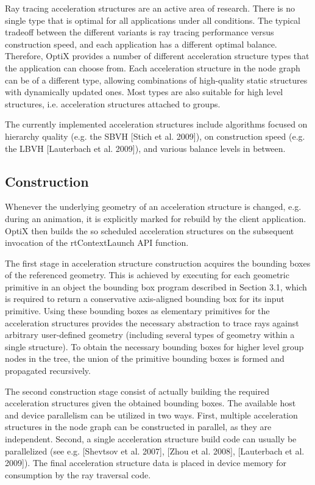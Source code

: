 Ray tracing acceleration structures are an active area of research.
There is no single type that is optimal for all applications under all
conditions. The typical tradeoff between the different variants is
ray tracing performance versus construction speed, and each application has a different optimal balance. Therefore, OptiX provides a
number of different acceleration structure types that the application
can choose from. Each acceleration structure in the node graph can
be of a different type, allowing combinations of high-quality static
structures with dynamically updated ones. Most types are also suitable for high level structures, i.e. acceleration structures attached to
groups.

The currently implemented acceleration structures include algorithms focused on hierarchy quality (e.g. the SBVH [Stich et al.
2009]), on construction speed (e.g. the LBVH [Lauterbach et al.
2009]), and various balance levels in between.

\subsection{Construction}

Whenever the underlying geometry of an acceleration structure is
changed, e.g. during an animation, it is explicitly marked for rebuild by the client application. OptiX then builds the so scheduled
acceleration structures on the subsequent invocation of the rtContextLaunch API function.

The first stage in acceleration structure construction acquires the
bounding boxes of the referenced geometry. This is achieved by
executing for each geometric primitive in an object the bounding
box program described in Section 3.1, which is required to return
a conservative axis-aligned bounding box for its input primitive.
Using these bounding boxes as elementary primitives for the acceleration structures provides the necessary abstraction to trace rays
against arbitrary user-defined geometry (including several types of
geometry within a single structure). To obtain the necessary bounding boxes for higher level group nodes in the tree, the union of the
primitive bounding boxes is formed and propagated recursively.

The second construction stage consist of actually building the required acceleration structures given the obtained bounding boxes.
The available host and device parallelism can be utilized in two
ways. First, multiple acceleration structures in the node graph can
be constructed in parallel, as they are independent. Second, a single
acceleration structure build code can usually be parallelized (see
e.g. [Shevtsov et al. 2007], [Zhou et al. 2008], [Lauterbach et al.
2009]). The final acceleration structure data is placed in device
memory for consumption by the ray traversal code.

